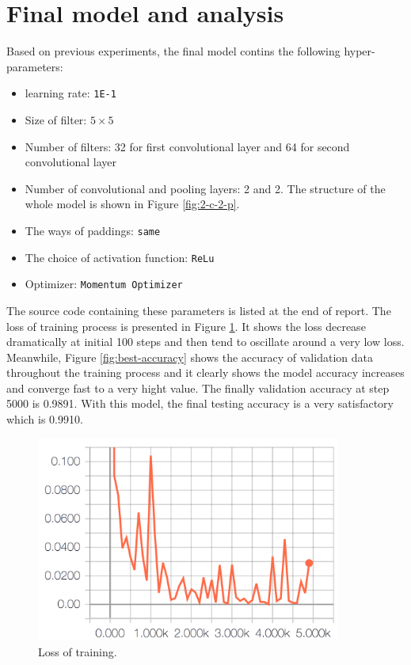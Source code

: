 \documentclass[11pt]{article}
\begin{document}
\clearpage

\section{Final model and analysis}
\label{summary}

Based on previous experiments, the final model contins the following hyper-parameters:

\begin{itemize}
\item
learning rate: {\tt 1E-1} 

\item
Size of filter:  $5\times5$

\item
Number of filters: 32 for first convolutional layer and 64 for second convolutional layer

\item
Number of convolutional and pooling layers: 2 and 2. The structure of the whole model is shown in Figure \ref{fig:2-c-2-p}.

\item
The ways of paddings: {\tt same}

\item
The choice of activation function: {\tt ReLu}

\item
Optimizer: {\tt Momentum Optimizer}
\end{itemize}
The source code containing these parameters is listed at the end of report. The loss of training process is presented in Figure \ref{fig:best-loss}. It shows the loss decrease dramatically at initial 100 steps and then tend to oscillate around a very low loss. Meanwhile, Figure \ref{fig:best-accuracy} shows the accuracy of validation data throughout the training process and it clearly shows the model accuracy increases and converge fast to a very hight value. The finally validation accuracy at step 5000 is 0.9891. With this model, the final testing accuracy is a very satisfactory which is 0.9910.


\begin{figure}[!htb]
   \centering
   \includegraphics[width=10cm]{images/best_loss.png} %
   \caption{Loss of training.}
   \label{fig:best-loss}
\end{figure}
\end{document}
